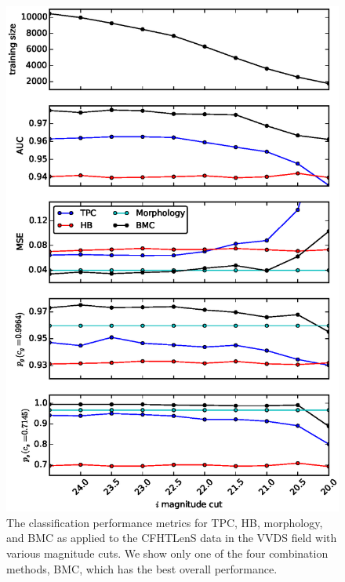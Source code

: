 \documentclass[useAMS,usenatbib]{mn2e}
\begin{document}
\begin{figure}
  \begin{minipage}[b]{0.49\linewidth}
    \includegraphics[width=\textwidth]{figures/perform_mag_cut.eps}
    \caption{The classification performance metrics for TPC, HB, morphology,
      and BMC as applied to the CFHTLenS data in the VVDS field
      with various magnitude cuts.
      We show only one of the four combination methods, BMC,
      which has the best overall performance.}
    \label{fig:perform_mag_cut}
  \end{minipage}
  \hfill
  \begin{minipage}[b]{0.49\linewidth}

\end{minipage}
\end{figure}
\end{document}
